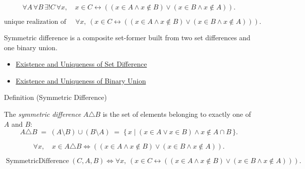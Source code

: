 \begin{remark*}
\[
  \forall A\,\forall B\,\exists! C\,\forall x,\quad
  x\in C\leftrightarrow
  ((x\in A\wedge x\notin B)\vee(x\in B\wedge x\notin A)).
\]
\end{remark*}

\begin{remark*}
\[
  \text{unique realization of }\quad
  \forall x,\ (x\in C\leftrightarrow((x\in A\wedge x\notin B)\vee
  (x\in B\wedge x\notin A))).
\]
\end{remark*}

\begin{remark*}[Interpretation]
Symmetric difference is a composite set-former built from two set differences
and one binary union.
\end{remark*}

\begin{dependencies}
\begin{itemize}
  \item \hyperref[cor:set-difference-exists-unique]{Existence and Uniqueness of Set Difference}
  \item \hyperref[cor:binary-union-exists-unique]{Existence and Uniqueness of Binary Union}
\end{itemize}
\end{dependencies}

\begin{definitionbox}{Definition (Symmetric Difference)}
\begin{definition}\label{def:sym-diff}
The \emph{symmetric difference} $A \triangle B$ is the set of elements
belonging to exactly one of $A$ and $B$:
\[
A \triangle B
\;=\;
(A \setminus B) \cup (B \setminus A)
\;=\;
\{\, x \mid (x \in A \lor x \in B) \land x \notin A \cap B \,\}.
\]
\end{definition}
\end{definitionbox}

\begin{remark*}
\[
  \forall x,\quad x\in A\triangle B
  \iff
  ((x\in A\wedge x\notin B)\vee(x\in B\wedge x\notin A)).
\]
\end{remark*}

\begin{remark*}
\[
  \operatorname{SymmetricDifference}(C,A,B)
  \iff
  \forall x,\ (x\in C \leftrightarrow ((x\in A\wedge x\notin B)\vee(x\in B\wedge x\notin A))).
\]
\end{remark*}

